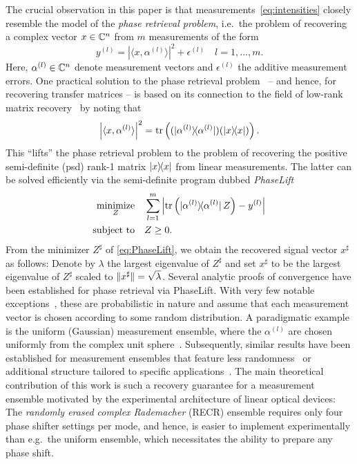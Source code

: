 The crucial observation in this paper is that measurements~\eqref{eq:intensities} closely resemble the model of the \textit{phase retrieval problem}, i.e.\ the problem of recovering a complex vector ${x} \in {\mathbb{C}}^n$ from $m$ measurements of the form
\[
  y^{(l)} = \left| \langle {x}, \alpha^{(l)} \rangle \right|^2 + \epsilon^{(l)}
  \quad l=1,\ldots,m.
  \label{eq:phase_retrieval_measurements}
\]
Here, $\alpha^{(l)} \in {\mathbb{C}}^n$ denote measurement vectors and $\epsilon^{(l)}$ the additive measurement errors.
One practical solution to the phase retrieval problem~\cite{balan_painless_2009} -- and hence, for recovering transfer matrices -- is based on its connection to the field of low-rank matrix recovery~\cite{ahrero12,candes_exact_2009,capl11,recht_guaranteed_2010,gross_recovering_2011,chen_incoherence_2013} by noting that
\[
  \left| \langle {x}, \alpha^{(l)} \rangle \right|^2
  = \tr \left( (\ket{\alpha^{(l)}}\bra{\alpha^{(l)}}) (\ket{{x}}\bra{{x}}) \right).
\]
This ``lifts'' the phase retrieval problem to the problem of recovering the positive semi-definite (psd) rank-1 matrix $\ket{ x}\bra{ x}$ from linear measurements.
The latter can be solved efficiently via the semi-definite program dubbed \emph{PhaseLift}~\cite{candes_phaselift_2012}
\begin{align}
  \underset{{Z}}{\textrm{minimize}} & \quad \sum_{l=1}^m \left| \tr \left( \ket{\alpha^{(l)}} \bra{\alpha^{(l)}} \, {Z} \right) - y^{(l)} \right| \label{eq:PhaseLift} \\
  \textrm{subject to} &\quad  {Z} \geq 0. \nonumber
\end{align}
From the minimizer ${ Z}^\sharp$ of \cref{eq:PhaseLift}, we obtain the recovered signal vector ${ x}^\sharp$ as follows:
Denote by $\lambda$ the largest eigenvalue of ${ Z}^\sharp$ and set ${ x}^\sharp$ to be the largest eigenvalue of ${ Z}^\sharp$ scaled to ${\Vert{ x}^\sharp\Vert} = \sqrt\lambda$.
Several analytic proofs of convergence have been established for phase retrieval via PhaseLift.
With very few notable exceptions~\cite{Kech_2016_Explicit}, these are probabilistic in nature and assume that each measurement vector is chosen according to some random distribution.
A paradigmatic example is the uniform (Gaussian) measurement ensemble, where the $\alpha^{(l)}$ are chosen uniformly from the complex unit sphere~\cite{Candes_2013_Phaselift}.
Subsequently, similar results have been established for measurement ensembles that feature less randomness~\cite{gross_partial_2013,kueng_low_2014,kueng_low_2016} or additional structure tailored to specific applications~\cite{candes_phase_2015,gross_improved_2017,voroninski_quantum_2013,kueng_low_2015}.
The main theoretical contribution of this work is such a recovery guarantee for a measurement ensemble motivated by the experimental architecture of linear optical devices:
The \emph{randomly erased complex Rademacher} (RECR) ensemble requires only four phase shifter settings per mode, and hence, is easier to implement experimentally than e.g.\ the uniform ensemble, which necessitates the ability to prepare any phase shift.

